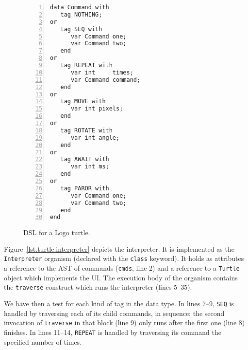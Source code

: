 \documentclass{acm_proc_article-sp}
\newcommand{\code}[1] {{\small{\texttt{#1}}}}
\begin{document}
\begin{comment}
The turtle has three attributes:
    a location
    an orientation
    a pen, itself having attributes such as color, width, and up versus down.
The turtle moves with commands that are relative to its own position, such as 
"move forward 10 spaces" and "turn left 90 degrees". The pen carried by the 
turtle can also be controlled, by enabling it, setting its color, or setting 
its width. A student could understand (and predict and reason about) the 
turtle's motion by imagining what they would do if they were the turtle.  
Seymour Papert called this "body syntonic" reasoning.
From these building blocks one can build more complex shapes like squares, 
triangles, circles and other composite figures. Combined with control flow, 
procedures, and recursion, the idea of turtle graphics is also useful in a 
Lindenmayer system for generating fractals.
Turtle geometry is also sometimes used in graphics environments as an 
alternative to a strictly coordinate-addressed graphics system.
\end{comment}

\begin{figure}%
\begin{lstlisting}[numbers=left,xleftmargin=3em]
data Command with
   tag NOTHING;
or
   tag SEQ with
      var Command one;
      var Command two;
   end
or
   tag REPEAT with
      var int     times;
      var Command command;
   end
or
   tag MOVE with
      var int pixels;
   end
or
   tag ROTATE with
      var int angle;
   end
or
   tag AWAIT with
      var int ms;
   end
or
   tag PAROR with
      var Command one;
      var Command two;
   end
end
\end{lstlisting}
\caption{ DSL for a Logo turtle.
\label{lst.turtle.dsl}
}
\end{figure}

Figure~\ref{lst.turtle.interpreter} depicts the interpreter. It is implemented
as the \code{Interpreter} organism (declared with the \code{class} keyword).
It holds as attributes a reference to the AST of commands (\code{cmds}, line 2)
and a reference to a \code{Turtle} object which implements the UI. The
execution body of the organism contains the \code{traverse} construct which
runs the interpreter (lines 5--35).

We have then a test for each kind of tag in the data type. In lines 7--9,
\code{SEQ} is handled by traversing each of its child commands, in sequence:
the second invocation of \code{traverse} in that block (line 9) only runs
after the first one (line 8) finishes. In lines 11--14, \code{REPEAT} is
handled by traversing its command the specified number of times.
\end{document}
